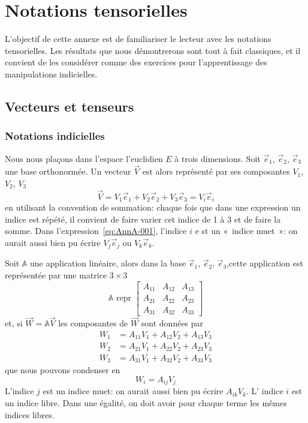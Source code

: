 \chapter{Notations tensorielles} \label{Ann:A}
L'objectif de cette annexe est de familiariser le lecteur avec les notations tensorielles.
Les résultats que nous démontrerons sont tout à fait classiques, et il convient de les considérer comme des exercices pour l'apprentissage des manipulations indicielles.
\section{Vecteurs et tenseurs}
\subsection{Notations indicielles}
Nous nous plaçons dans l'espace l'euclidien $E$ à trois dimensions.
Soit $\vec{e}_1$, $\vec{e}_2$, $\vec{e}_3$ une base orthonormée.
Un vecteur $\vec{V}$ est alors représenté par ses composantes $V_1$, $V_2$, $V_3$
\begin{equation}
    \vec{V} = V_1 \vec{e}_1 + V_2 \vec{e}_2 + V_3 \vec{e}_3 = V_i \vec{e}_i
    \label{eq:AnnA-001}
\end{equation}
en utilisant la convention de sommation: chaque fois que dans une expression un indice est répété, il convient de faire varier cet indice de 1 à 3 et de faire la somme.
Dans l'expression~\eqref{eq:AnnA-001}, l'indice $i$ e st un «~indice muet~»: on aurait aussi bien pu écrire $V_j \vec{e}_j$ ou $V_k \vec{e}_k$.

Soit $\mathbb{A}$ une application linéaire, alors dans la base $\vec{e}_1$, $\vec{e}_2$, $\vec{e}_3$,cette application est représentée par une matrice $3\times3$
\begin{equation}
    \mathbb{A} \text{ repr } 
    \begin{bmatrix}
        A_{11} & A_{12} & A_{13} \\    
        A_{21} & A_{22} & A_{23} \\    
        A_{31} & A_{32} & A_{33} 
    \end{bmatrix}
    \label{eq:AnnA-002}
\end{equation}
et, si $\vec{W} = \mathbb{A} \vec{V}$ les composantes de $\vec{W}$ sont données par
\begin{align*}
    W_1 &= A_{11} V_1 + A_{12} V_2 + A_{13} V_3\\
    W_2 &= A_{21} V_1 + A_{22} V_2 + A_{23} V_3\\
    W_3 &= A_{31} V_1 + A_{32} V_2 + A_{33} V_3
\end{align*}
que nous pouvons condenser en
\begin{equation}
    W_i = A_{ij} V_j
    \label{eq:AnnA-003}
\end{equation}
L'indice $j$ est un indice muet: on aurait aussi bien pu écrire $A_{ik} V_k$.
L' indice $i$ est un indice libre.
Dans une égalité, on doit avoir pour chaque terme les mêmes indices libres.

